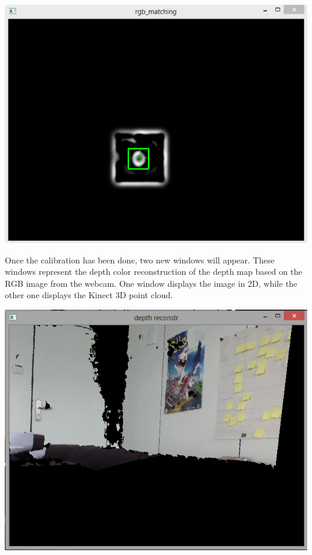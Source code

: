 \begin{center}
	\includegraphics[scale=0.7]{images/good_rgb_matching.png}
\end{center}

\noindent
Once the calibration has been done, two new windows will appear. These windows represent the depth color reconstruction of the depth map based on the RGB image from the webcam. One window displays the image in 2D, while the other one displays the Kinect 3D point cloud. 

\begin{center}
	\includegraphics[scale=0.7]{images/depth_reconstruction_1.png}
\end{center}

